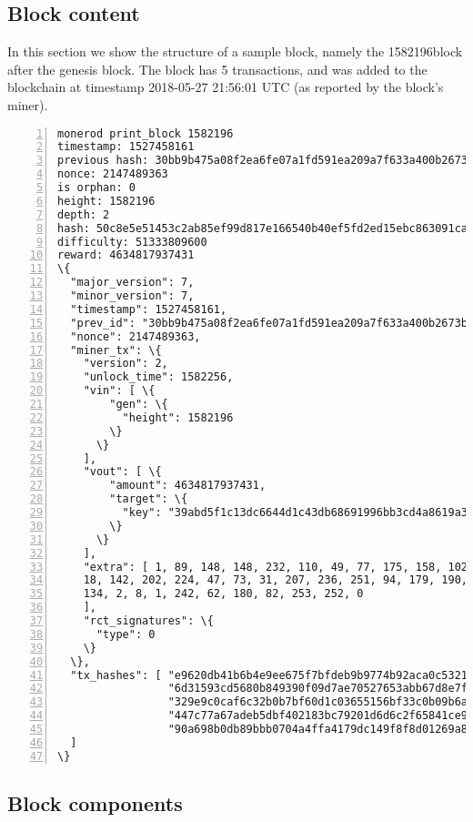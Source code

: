 \begin{appendices}
\chapter{Block content}
\label{appendix:block-content}

In this section we show the structure of a sample block, namely the 1582196\nth block after the genesis block. The block has 5 transactions, and was added to the blockchain at timestamp 2018-05-27 21:56:01 UTC (as reported by the block's miner).


\begin{Verbatim}[commandchars=\\\{\}, numbers=left]
monerod print_block 1582196
timestamp: 1527458161
previous hash: 30bb9b475a08f2ea6fe07a1fd591ea209a7f633a400b2673b8835a975348b0eb
nonce: 2147489363
is orphan: 0
height: 1582196
depth: 2
hash: 50c8e5e51453c2ab85ef99d817e166540b40ef5fd2ed15ebc863091ca2a04594
difficulty: 51333809600
reward: 4634817937431
\{
  "major_version": 7,
  "minor_version": 7,
  "timestamp": 1527458161,
  "prev_id": "30bb9b475a08f2ea6fe07a1fd591ea209a7f633a400b2673b8835a975348b0eb",
  "nonce": 2147489363,
  "miner_tx": \{
    "version": 2,
    "unlock_time": 1582256,
    "vin": [ \{
        "gen": \{
          "height": 1582196
        \}
      \}
    ],
    "vout": [ \{
        "amount": 4634817937431,
        "target": \{
          "key": "39abd5f1c13dc6644d1c43db68691996bb3cd4a8619a37a227667cf2bf055401"
        \}
      \}
    ],
    "extra": [ 1, 89, 148, 148, 232, 110, 49, 77, 175, 158, 102, 45, 72, 201, 193,
    18, 142, 202, 224, 47, 73, 31, 207, 236, 251, 94, 179, 190, 71, 72, 251, 110, 
    134, 2, 8, 1, 242, 62, 180, 82, 253, 252, 0
    ],
    "rct_signatures": \{
      "type": 0
    \}
  \},
  "tx_hashes": [ "e9620db41b6b4e9ee675f7bfdeb9b9774b92aca0c53219247b8f8c7aecf773ae",
                 "6d31593cd5680b849390f09d7ae70527653abb67d8e7fdca9e0154e5712591bf",
                 "329e9c0caf6c32b0b7bf60d1c03655156bf33c0b09b6a39889c2ff9a24e94a54",
                 "447c77a67adeb5dbf402183bc79201d6d6c2f65841ce95cf03621da5a6bffefc",
                 "90a698b0db89bbb0704a4ffa4179dc149f8f8d01269a85f46ccd7f0007167ee4"
  ]
\}
\end{Verbatim}


\section*{Block components}


\end{appendices}

